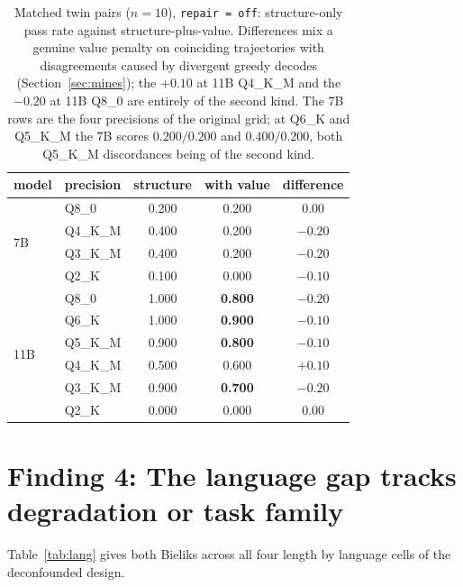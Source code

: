 \documentclass[11pt]{article}
\begin{document}
\begin{table}[h]
\centering
\caption{Matched twin pairs ($n=10$), \texttt{repair\,=\,off}: structure-only pass rate against structure-plus-value. Differences mix a genuine value penalty on coinciding trajectories with disagreements caused by divergent greedy decodes (Section~\ref{sec:mines}); the $+0.10$ at 11B Q4\_K\_M and the $-0.20$ at 11B Q8\_0 are entirely of the second kind. The 7B rows are the four precisions of the original grid; at Q6\_K and Q5\_K\_M the 7B scores $0.200/0.200$ and $0.400/0.200$, both Q5\_K\_M discordances being of the second kind.}
\label{tab:twins}
\begin{tabular}{llccc}
\toprule
model & precision & structure & with value & difference \\
\midrule
\multirow{4}{*}{7B}
 & Q8\_0   & 0.200 & 0.200 & $0.00$ \\
 & Q4\_K\_M & 0.400 & 0.200 & $-0.20$ \\
 & Q3\_K\_M & 0.400 & 0.200 & $-0.20$ \\
 & Q2\_K   & 0.100 & 0.000 & $-0.10$ \\
\midrule
\multirow{6}{*}{11B}
 & Q8\_0   & 1.000 & \textbf{0.800} & $-0.20$ \\
 & Q6\_K   & 1.000 & \textbf{0.900} & $-0.10$ \\
 & Q5\_K\_M & 0.900 & \textbf{0.800} & $-0.10$ \\
 & Q4\_K\_M & 0.500 & 0.600 & $+0.10$ \\
 & Q3\_K\_M & 0.900 & \textbf{0.700} & $-0.20$ \\
 & Q2\_K   & 0.000 & 0.000 & $0.00$ \\
\bottomrule
\end{tabular}
\end{table}

\section{Finding 4: The language gap tracks degradation or task family}
\label{sec:f4}

Table~\ref{tab:lang} gives both Bieliks across all four length by language cells of the deconfounded design.
\end{document}
